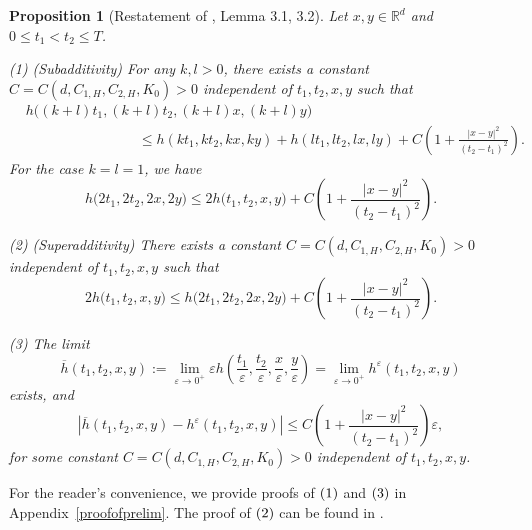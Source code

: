 \documentclass[reqno,11pt]{amsart}
\newtheorem{theorem}{Theorem}[section]
\newtheorem{proposition}[theorem]{Proposition}
\numberwithin{equation}{section}
\newcommand{\R}{\mathbb{R}} %
\newcommand{\e}{\varepsilon}
\newcommand{\ep}{\varepsilon}
\newcommand{\nd}{\noindent}
\renewcommand{\bar}{\overline}
\begin{document}
\begin{proposition}[Restatement of \cite{TranYu2021}, Lemma 3.1, 3.2]\label{prop:subsuperm}
Let $x, y \in \R^d$ and $0\leq t_1 < t_2 \leq T$.

\nd
(1) (Subadditivity) For any \(k,l> 0\), there exists a constant \(C=C(d, C_{1, H}, C_{2, H}, K_0)>0\) independent of \(t_1, t_2, x , y\) such that
    \[
    \begin{aligned}
    &h\bigl((k+l)t_1,(k+l)t_2,(k+l)x,(k+l)y\bigr) \\
    & \qquad \qquad \qquad \qquad \le h\left(kt_1,kt_2,kx,ky\right)+ h\left(lt_1, lt_2, lx,ly\right) + C\left(1+\frac{|x-y|^2}{(t_2-t_1)^2}\right).
    \end{aligned}
    \]
    For the case \(k=l=1\), we have
    \[
  h\bigl(2t_1,2t_2, 2x,2y\bigr) \le 2h\bigl(t_1,t_2,x,y\bigr)+ C\left(1+\frac{|x-y|^2}{(t_2-t_1)^2}\right).
    \]

\nd
 (2) (Superadditivity) There exists a constant \(C=C(d, C_{1, H}, C_{2, H}, K_0)>0\) independent of \(t_1,t_2,x,y\) such that
        \[
  2h\bigl(t_1,t_2,x,y\bigr) \leq h\bigl(2t_1,2t_2, 2x,2y\bigr) + C\left(1+\frac{|x-y|^2}{(t_2-t_1)^2}\right).
    \]

\nd
(3) The limit
\[
\bar{h}\left(t_1,t_2,x,y\right):=\lim_{\ep\to 0^+} \ep h\left(\frac{t_1}{\ep},\frac{t_2}{\ep}, \frac{x}{\ep},\frac{y}{\ep}\right) =\lim_{\ep\to 0^+}  h^\e (t_1, t_2, x,y )
\]
exists, and
\[
\left|\bar{h}\left(t_1,t_2,x,y\right)-h^\e (t_1, t_2, x,y )\right|\leq C \left(1+\frac{|x-y|^2}{(t_2-t_1)^2}\right)\ep,
\]
for some constant \(C=C(d, C_{1, H}, C_{2, H}, K_0)>0\) independent of \(t_1,t_2,x , y\).
\end{proposition}

For the reader's convenience, we provide proofs of $\rm{(1)}$ and $\rm{(3)}$ in Appendix~\ref{proofofprelim}. The proof of $\rm{(2)}$ can be found in \cite{TranYu2021}.




\end{document}
